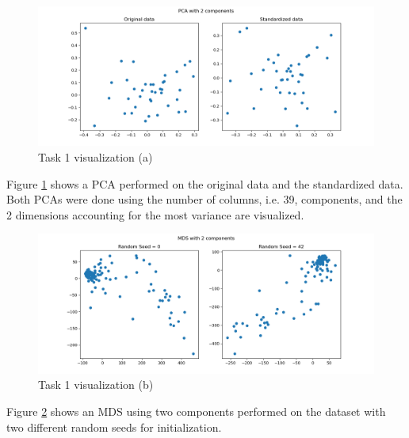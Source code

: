 \documentclass[11pt,a4paper,titlepage]{article}
\begin{document}
\begin{figure}[h!]
    \centering
    \includegraphics[width=1.0\linewidth]{reports/assignment-4/imgs/pca.png}
    \caption{Task 1 visualization (a)}
    \label{fig:pca}
\end{figure}

Figure \ref{fig:pca} shows a PCA performed on the original data and the standardized data. Both PCAs were done using the number of columns, i.e. 39, components, and the 2 dimensions accounting for the most variance are visualized.

\begin{figure}[h!]
    \centering
    \includegraphics[width=1.0\linewidth]{reports/assignment-4/imgs/mds.png}
    \caption{Task 1 visualization (b)}
    \label{fig:mds}
\end{figure}

\newpage

Figure \ref{fig:mds} shows an MDS using two components performed on the dataset with two different random seeds for initialization.
\end{document}
